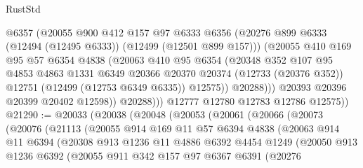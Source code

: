\begin{lexlean}{RustStd}
\begin{coremodule}
                    @6357
                    (@20055
                      @900
                      @412
                      @157
                      @97
                      @6333
                      @6356
                      (@20276 @899 @6333 (@12494 (@12495 @6333)) (@12499 (@12501 @899 @157)))
                      (@20055
                        @410
                        @169
                        @95
                        @57
                        @6354
                        @4838
                        (@20063
                          @410
                          @95
                          @6354
                          (@20348
                            @352
                            @107
                            @95
                            @4853
                            @4863
                            @1331
                            @6349
                            @20366
                            @20370
                            @20374
                            (@12733 (@20376 @352))
                            @12751
                            (@12499 (@12753 @6349 @6335))
                            @12575))
                        @20288)))
                  @20393
                  @20396
                  @20399
                  @20402
                  @12598))
              @20288)))
        @12777
        @12780
        @12783
        @12786
        @12575))
@21290 := @20033
    (@20038
      (@20048
        (@20053
          (@20061
            (@20066
              (@20073
                (@20076
                  (@21113
                    (@20055
                      @914
                      @169
                      @11
                      @57
                      @6394
                      @4838
                      (@20063
                        @914
                        @11
                        @6394
                        (@20308
                          @913
                          @1236
                          @11
                          @4886
                          @6392
                          @4454
                          @1249
                          (@20050
                            @913
                            @1236
                            @6392
                            (@20055
                              @911
                              @342
                              @157
                              @97
                              @6367
                              @6391
                              (@20276

\end{coremodule}
\end{lexlean}
